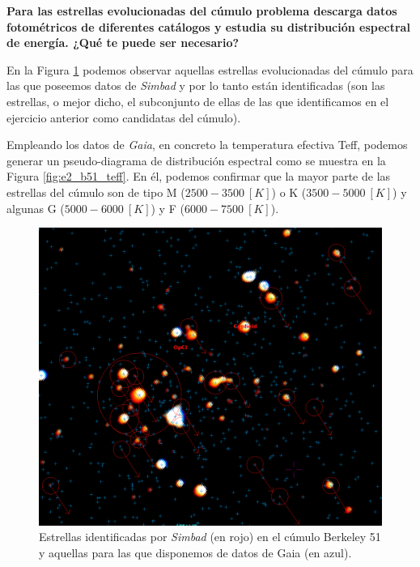 \documentclass[a4paper,fleqn,usenatbib]{mnras}
\begin{document}
\textbf{Para las estrellas evolucionadas del cúmulo problema descarga datos fotométricos de diferentes catálogos y estudia su distribución espectral de energía. ¿Qué te puede ser necesario?}

En la Figura \ref{fig:e2_b51_simbad} podemos observar aquellas estrellas evolucionadas del cúmulo para las que poseemos datos de \emph{Simbad} y por lo tanto están identificadas (son las estrellas, o mejor dicho, el subconjunto de ellas de las que identificamos en el ejercicio anterior como candidatas del cúmulo).

\newpage

Empleando los datos de \emph{Gaia}, en concreto la temperatura efectiva Teff, podemos generar un pseudo-diagrama de distribución espectral como se muestra en la Figura \ref{fig:e2_b51_teff}. En él, podemos confirmar que la mayor parte de las estrellas del cúmulo son de tipo M ($2500-3500~[K]$) o K ($3500-5000~[K]$) y algunas G ($5000-6000~[K]$) y F ($6000-7500~[K]$).

\begin{figure}
  \includegraphics[width=\linewidth]{img/simbad_b51}
  \caption{Estrellas identificadas por \emph{Simbad} (en rojo) en el cúmulo Berkeley 51 y aquellas para las que disponemos de datos de Gaia (en azul).}
  \label{fig:e2_b51_simbad}
\end{figure}
\end{document}
